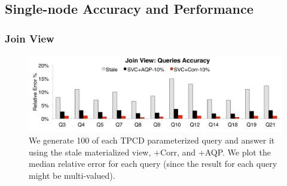 \subsection{Single-node Accuracy and Performance}
\vspace{-.5em}
\subsubsection{Join View}



\begin{figure}[t]
\centering
\includegraphics[scale=0.13]{exp/msj_3.pdf}\vspace{-.5em}
 \caption{We generate 100 of each TPCD parameterized query and answer it using the stale materialized view, \svcnospace+Corr, and \svcnospace+AQP. We plot the median relative error for each query (since the result for each query might be multi-valued).\label{exp-1-acc}}
\end{figure}

